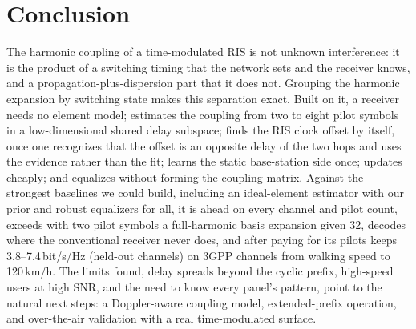 \section{Conclusion}\label{sec:conclusion}
The harmonic coupling of a time-modulated RIS is not unknown interference: it is the product of a
switching timing that the network sets and the receiver knows, and a propagation-plus-dispersion
part that it does not. Grouping the harmonic expansion by switching state makes this separation
exact. Built on it, a receiver needs no element model; estimates the coupling from two to eight pilot
symbols in a low-dimensional shared delay subspace; finds the RIS clock offset by itself, once one
recognizes that the offset is an opposite delay of the two hops and uses the evidence rather than
the fit; learns the static base-station side once; updates cheaply; and equalizes without forming the
coupling matrix. Against the strongest baselines we could build, including an ideal-element estimator with our prior and robust
equalizers for all, it is ahead on every channel and pilot count, exceeds with two pilot symbols a
full-harmonic basis expansion given 32,
decodes where the conventional receiver never does, and after paying for its pilots keeps
3.8--7.4\,bit/s/Hz (held-out channels) on 3GPP channels from walking speed to 120\,km/h. The limits found, delay spreads
beyond the cyclic prefix, high-speed users at high SNR, and the need to know every panel's pattern,
point to the natural next steps: a Doppler-aware coupling model, extended-prefix operation, and
over-the-air validation with a real time-modulated surface.
